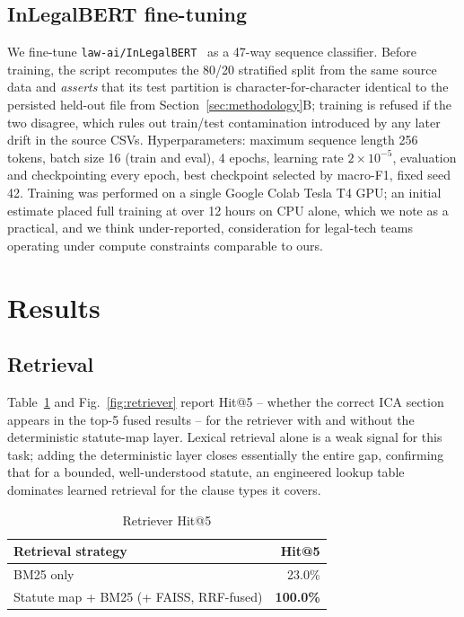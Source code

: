 \documentclass[conference]{IEEEtran}
\begin{document}
\subsection{InLegalBERT fine-tuning}
\label{sec:bert-finetune}

We fine-tune \texttt{law-ai/InLegalBERT}~\cite{inlegalbert2023} as a 47-way sequence classifier. Before training, the script recomputes the 80/20 stratified split from the same source data and \emph{asserts} that its test partition is character-for-character identical to the persisted held-out file from Section~\ref{sec:methodology}B; training is refused if the two disagree, which rules out train/test contamination introduced by any later drift in the source CSVs. Hyperparameters: maximum sequence length 256 tokens, batch size 16 (train and eval), 4 epochs, learning rate $2\times10^{-5}$, evaluation and checkpointing every epoch, best checkpoint selected by macro-F1, fixed seed 42. Training was performed on a single Google Colab Tesla T4 GPU; an initial estimate placed full training at over 12 hours on CPU alone, which we note as a practical, and we think under-reported, consideration for legal-tech teams operating under compute constraints comparable to ours.

\section{Results}
\label{sec:results}

\subsection{Retrieval}

Table~\ref{tab:retriever} and Fig.~\ref{fig:retriever} report Hit@5 -- whether the correct ICA section appears in the top-5 fused results -- for the retriever with and without the deterministic statute-map layer. Lexical retrieval alone is a weak signal for this task; adding the deterministic layer closes essentially the entire gap, confirming that for a bounded, well-understood statute, an engineered lookup table dominates learned retrieval for the clause types it covers.

\begin{table}[t]
\caption{Retriever Hit@5}
\label{tab:retriever}
\centering
\begin{tabular}{@{}lr@{}}
\toprule
Retrieval strategy & Hit@5 \\
\midrule
BM25 only & 23.0\% \\
Statute map + BM25 (+ FAISS, RRF-fused) & \textbf{100.0\%} \\
\bottomrule
\end{tabular}
\end{table}
\end{document}
